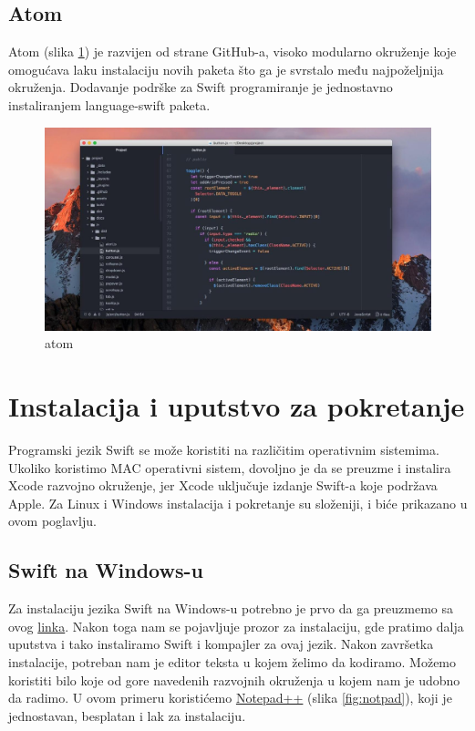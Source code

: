 \documentclass[a4paper]{article}
\begin{document}
\subsection{Atom}
\label{subsec:podnaslovAtom}
Atom (slika \ref{fig:atom}) je razvijen od strane GitHub-a, visoko modularno okruženje koje omogućava laku instalaciju novih paketa što ga je svrstalo među najpoželjnija okruženja. Dodavanje podrške za Swift programiranje je jednostavno instaliranjem language-swift paketa.

\begin{figure}[h!]
\begin{center}
\includegraphics[scale=0.2]{atom.jpg}
\end{center}
\caption{atom}
\label{fig:atom}
\end{figure}


\section{Instalacija i uputstvo za pokretanje}	
\label{sec:petiDeo}

Programski jezik Swift se može koristiti na različitim operativnim sistemima. Ukoliko koristimo MAC operativni sistem, dovoljno je da se preuzme i instalira Xcode razvojno okruženje, jer Xcode uključuje izdanje Swift-a koje podržava Apple. Za Linux i Windows instalacija i pokretanje su složeniji, i biće prikazano u ovom poglavlju.

\subsection{Swift na Windows-u}
\label{subsec:podnaslovWindows}

Za instalaciju jezika Swift na Windows-u potrebno je prvo da ga preuzmemo sa ovog \href{https://swiftforwindows.github.io}{linka}. Nakon toga nam se pojavljuje prozor za instalaciju, gde pratimo dalja uputstva i tako instaliramo Swift i kompajler za ovaj jezik. Nakon završetka instalacije, potreban nam je editor teksta u kojem želimo da kodiramo. Možemo koristiti bilo koje od gore navedenih razvojnih okruženja u kojem nam je udobno da radimo. U ovom primeru koristićemo \href{https://notepad-plus-plus.org/download/v7.6.4.html}{Notepad++} (slika \ref{fig:notpad}), koji je jednostavan, besplatan i lak za instalaciju.
\end{document}
